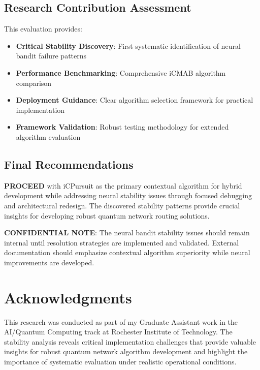 \documentclass[12pt,a4paper]{article}
\newcommand{\critical}[1]{\textcolor{criticalcolor}{\textbf{#1}}}
\newcommand{\success}[1]{\textcolor{successcolor}{\textbf{#1}}}
\begin{document}
\subsection{Research Contribution Assessment}

This evaluation provides:
\begin{itemize}
\item \textbf{Critical Stability Discovery}: First systematic identification of neural bandit failure patterns
\item \textbf{Performance Benchmarking}: Comprehensive iCMAB algorithm comparison
\item \textbf{Deployment Guidance}: Clear algorithm selection framework for practical implementation
\item \textbf{Framework Validation}: Robust testing methodology for extended algorithm evaluation
\end{itemize}

\subsection{Final Recommendations}

\success{\textbf{PROCEED}} with iCPursuit as the primary contextual algorithm for hybrid development while addressing neural stability issues through focused debugging and architectural redesign. The discovered stability patterns provide crucial insights for developing robust quantum network routing solutions.

\critical{\textbf{CONFIDENTIAL NOTE}}: The neural bandit stability issues should remain internal until resolution strategies are implemented and validated. External documentation should emphasize contextual algorithm superiority while neural improvements are developed.

\section{Acknowledgments}

This research was conducted as part of my Graduate Assistant work in the AI/Quantum Computing track at Rochester Institute of Technology. The stability analysis reveals critical implementation challenges that provide valuable insights for robust quantum network algorithm development and highlight the importance of systematic evaluation under realistic operational conditions.
\end{document}
